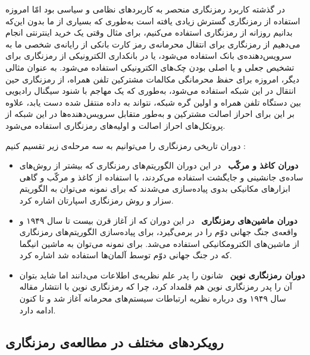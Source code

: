 در گذشته کاربرد رمزنگاری منحصر به کاربردهای نظامی و سیاسی بود امّا امروزه استفاده از رمزنگاری گسترش زیادی یافته است به‌‌طوری که بسیاری از ما بدون این‌که بدانیم روزانه از رمزنگاری استفاده می‌کنیم، برای مثال وقتی یک خرید اینترنتی انجام می‌دهیم از رمزنگاری برای انتقال محرمانه‌ی رمز کارت بانکی از رایانه‌ی شخصی ما به سرویس‌دهنده‌ی بانک استفاده می‌شود، یا در بانکداری الکترونیکی از رمزنگاری برای تشخیص جعلی و یا اصلی بودن چک‌های الکترونیکی استفاده می‌شود. به عنوان مثالی دیگر، امروزه برای حفظ محرمانگی مکالمات مشترکین تلفن همراه، از رمزنگاری حین انتقال  در این شبکه استفاده می‌شود،  به‌طوری که یک مهاجم با شنود سیگنال  رادیویی  بین دستگاه تلفن همراه  و اولین گره شبکه، نتواند به داده  منتقل شده  دست یابد، علاوه بر این برای احراز اصالت مشترکین و به‌طور متقابل سرویس‌دهنده‌ها در این شبکه از پروتکل‌های احراز اصالت و اولیه‌های رمزنگاری  استفاده می‌شود. 

دوران تاریخی رمزنگاری را می‌توانیم به سه مرحله‌ی زیر تقسیم کنیم
	\cite{kahn1996code}:
\begin{itemize}
	\item
	\textbf{دوران کاغذ و مرکّب}
	\ در این دوران الگوریتم‌های رمزنگاری که بیشتر از روش‌های ساده‌ی جانشینی
	و جایگشت
	استفاده می‌کردند، با استفاده از کاغذ و مرکّب و گاهی ابزار‌های مکانیکی بدوی پیاده‌سازی می‌شدند که برای نمونه می‌توان به الگوریتم سزار و روش رمزنگاری اسپارتان اشاره کرد.
	\item
\textbf{دوران ماشین‌های رمزنگاری}
\ در این دوران که از آغاز قرن بیست تا سال ۱۹۴۹ و واقعه‌ی جنگ جهانی دوّم را در برمی‌گیرد، برای پیاده‌سازی الگوریتم‌های رمزنگاری از ماشین‌های الکترومکانیکی استفاده می‌شد. برای نمونه می‌توان به ماشین انیگما که در جنگ جهانی دوّم توسط  آلمان‌ها استفاده شد اشاره کرد.
\item
\textbf{دوران رمزنگاری نوین}
\ شانون را پدر علم نظریه‌ی اطلاعات می‌دانند اما شاید بتوان آن را پدر رمزنگاری نوین هم قلمداد کرد، چرا که رمزنگاری نوین با انتشار مقاله‌  سال ۱۹۴۹ وی 
\cite{shannon1949communication}
درباره نظریه‌ ارتباطات سیستم‌های محرمانه آغاز شد و تا کنون ادامه دارد.
\end{itemize}

\subsection*{رویکرد‌های مختلف در مطالعه‌ی رمزنگاری}
